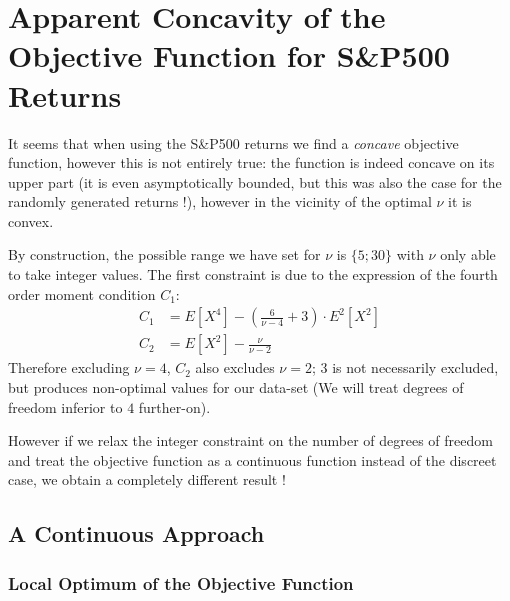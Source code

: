 \chapter{Apparent Concavity of the Objective Function for S\&P500 Returns}



It seems that when using the S\&P500 returns we find a \emph{concave} objective function, however this is not entirely true: the function is indeed concave on its upper part (it is even asymptotically bounded, but this was also the case for the randomly generated returns !), however in the vicinity of the optimal $\nu$ it is convex. \smallskip
\par
By construction, the possible range we have set for $\nu$ is $\{5;30\}$ with $\nu$ only able to take integer values. The first constraint is due to the expression of the fourth order moment condition $C_1$:
\begin{align*}
    C_1 &= E\left[X^4\right] - \left(\frac{6}{\nu-4}+3\right)\cdot E^2\left[X^2\right] \\
    C_2 &= E\left[X^2\right] - \frac{\nu}{\nu - 2}
\end{align*}
Therefore excluding $\nu = 4$, $C_2$ also excludes $\nu=2$; $3$ is not necessarily excluded, but produces non-optimal values for our data-set (We will treat degrees of freedom inferior to $4$ further-on).
\par
However if we relax the integer constraint on the number of degrees of freedom and treat the objective function as a continuous function instead of the discreet case, we obtain a completely different result !


\section{A Continuous Approach}

\subsection{Local Optimum of the Objective Function}

